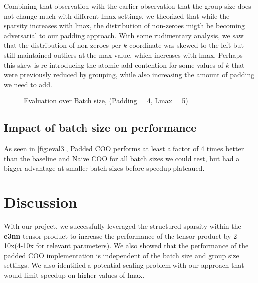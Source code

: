 Combining that observation with the earlier observation that the group size does not change much with different lmax settings, we theorized
that while the sparsity increases with lmax, the distribution of non-zeroes migth be becoming adversarial to our padding approach. With some rudimentary analysis,
we saw that the distribution of non-zeroes per $k$ coordinate was skewed to the left but still maintained outliers at the max value, which increases with lmax.
Perhaps this skew is re-introducing the atomic add contention for some values of $k$ that were previously reduced by grouping, while also increasing the amount
of padding we need to add.

\begin{figure}
    \centering
    \caption{Evaluation over Batch size, (Padding = 4, Lmax = 5)}
    \label{fig:eval3}   
\end{figure}
\subsection{Impact of batch size on performance}
As seen in \autoref{fig:eval3}, Padded COO performs at least a factor of 4 times better than the 
baseline and Naive COO for all batch sizes we could test, but had a bigger advantage at smaller batch sizes before 
speedup plateaued.
\section{Discussion} 
With our project, we successfully leveraged the structured sparsity within the \textbf{e3nn} tensor product to increase
the performance of the tensor product by 2-10x(4-10x for relevant parameters). We also showed that the performance of the
 padded COO implementation is independent of the batch size and group size settings. We also identified a potential scaling problem
 with our approach that would limit speedup on higher values of lmax. 
